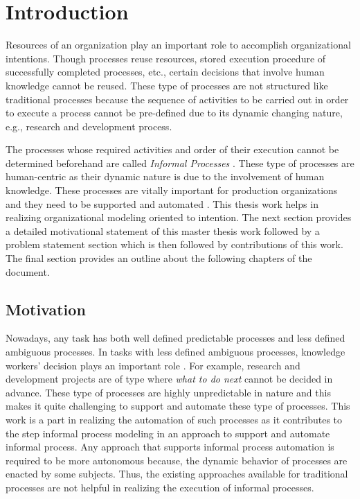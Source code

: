 \chapter{Introduction}
\label{chap:introduction}

Resources of an organization play an important role to accomplish organizational intentions. Though processes reuse resources, stored execution procedure of successfully completed processes, etc., certain decisions that involve human knowledge cannot be reused. These type of processes are not structured like traditional processes because the sequence of activities to be carried out in order to execute a process cannot be pre-defined due to its dynamic changing nature, e.g., research and development process.

The processes whose required activities and order of their execution cannot be determined beforehand are called \textit{Informal Processes} \cite{Sungur2014}. These type of processes are human-centric as their dynamic nature is due to the involvement of human knowledge. These processes are vitally important for production organizations and they need to be supported and automated \cite{Sungur2015b}. This thesis work helps in realizing organizational modeling oriented to intention. The next section provides a detailed motivational statement of this master thesis work followed by a problem statement section which is then followed by contributions of this work. The final section provides an outline about the following chapters of the document. 

\section{Motivation}
\label{sec:motivation}
Nowadays, any task has both well defined predictable processes and less defined ambiguous processes. In tasks with less defined ambiguous processes, knowledge workers' decision plays an important role \cite{BPTrends2009}. For example, research and development projects are of type where \textit{what to do next} cannot be decided in advance. These type of processes are highly unpredictable in nature and this makes it quite challenging to support and automate these type of processes. This work is a part in realizing the automation of such processes as it contributes to the step informal process modeling in an approach to support and automate informal process. Any approach that supports informal process automation is required to be more autonomous because, the dynamic behavior of processes are enacted by some subjects. Thus, the existing approaches available for traditional processes are not helpful in realizing the execution of informal processes.  

